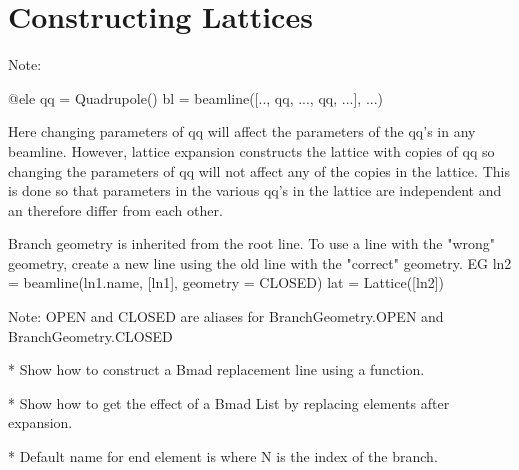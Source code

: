 \chapter{Constructing Lattices}
\label{c:construct-lat}

Note: 
\begin{example}
  @ele qq = Quadrupole()
  bl = beamline([.., qq, ..., qq, ...], ...)
\end{example}
Here changing parameters of qq will affect the parameters of the qq's in any beamline.
However, lattice expansion constructs the lattice with copies of qq so changing the
parameters of qq will not affect any of the copies in the lattice. This is done so that
parameters in the various qq's in the lattice are independent and an therefore differ from each
other. 

Branch geometry is inherited from the root line. To use a line with the "wrong" geometry, create
a new line using the old line with the "correct" geometry. EG
  ln2 = beamline(ln1.name, [ln1], geometry = CLOSED)
  lat = Lattice([ln2])

Note: OPEN and CLOSED are aliases for BranchGeometry.OPEN and BranchGeometry.CLOSED

* Show how to construct a Bmad replacement line using a function.

* Show how to get the effect of a Bmad List by replacing elements after expansion.

* Default name for end element is  where N is the index of the branch.